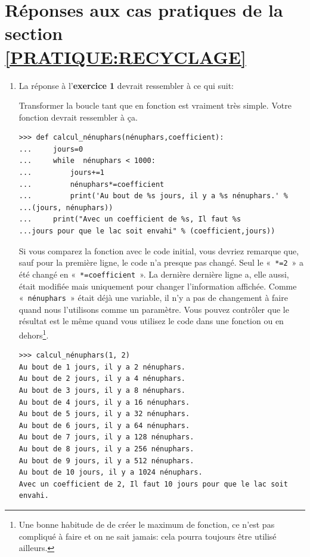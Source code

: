 \section{Réponses aux cas pratiques de la section  \ref{PRATIQUE:RECYCLAGE}\label{REPONSES:RECYCLAGE}}
\begin{enumerate}
\item La réponse à l'\textbf{exercice 1} devrait ressembler à ce qui suit: 

Transformer la boucle tant que en fonction est vraiment très simple. Votre fonction devrait ressembler à ça.

\begin{Verbatim}[frame=single,rulecolor=\color{mbleu}, label=à taper]
>>> def calcul_nénuphars(nénuphars,coefficient):
...     jours=0
...     while  nénuphars < 1000:
...         jours+=1
...         nénuphars*=coefficient
...         print('Au bout de %s jours, il y a %s nénuphars.' % 
...(jours, nénuphars))
...     print("Avec un coefficient de %s, Il faut %s 
...jours pour que le lac soit envahi" % (coefficient,jours))
\end{Verbatim}

Si vous comparez la fonction avec le code initial, vous devriez remarque que, sauf pour la première ligne, le code n'a presque pas changé. Seul le «~\texttt{*=2}~» a été changé en «~\texttt{*=coefficient}~». La dernière dernière ligne a, elle aussi, était modifiée mais uniquement pour changer l'information affichée. Comme «~\texttt{nénuphars}~» était déjà une variable, il n'y a pas de changement à faire quand nous l'utilisons comme un paramètre. Vous pouvez contrôler que le résultat est le même quand vous utilisez le code dans une fonction ou en dehors\footnote{Une bonne habitude de de créer le maximum de fonction, ce n'est pas compliqué à faire et on ne sait jamais: cela pourra toujours être utilisé ailleurs.}.

\begin{Verbatim}[frame=single,rulecolor=\color{mbleu}, label=à taper]
>>> calcul_nénuphars(1, 2)
Au bout de 1 jours, il y a 2 nénuphars.
Au bout de 2 jours, il y a 4 nénuphars.
Au bout de 3 jours, il y a 8 nénuphars.
Au bout de 4 jours, il y a 16 nénuphars.
Au bout de 5 jours, il y a 32 nénuphars.
Au bout de 6 jours, il y a 64 nénuphars.
Au bout de 7 jours, il y a 128 nénuphars.
Au bout de 8 jours, il y a 256 nénuphars.
Au bout de 9 jours, il y a 512 nénuphars.
Au bout de 10 jours, il y a 1024 nénuphars.
Avec un coefficient de 2, Il faut 10 jours pour que le lac soit 
envahi.
\end{Verbatim}


\end{enumerate}
